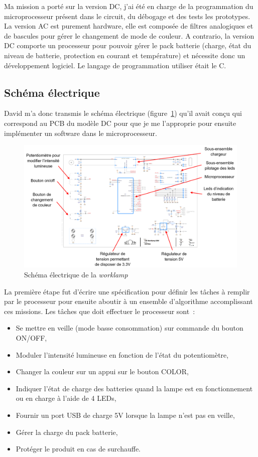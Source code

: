 \documentclass[a4paper, 12pt, sffamily]{report}
\begin{document}
Ma mission a porté sur la version DC, j’ai été en charge de la programmation du microprocesseur présent dans le circuit, du débogage et des tests les prototypes. La version AC est purement hardware, elle est composée de filtres analogiques et de bascules pour gérer le changement de mode de couleur. A contrario, la version DC comporte un processeur pour pouvoir gérer le pack batterie (charge, état du niveau de batterie, protection en courant et température) et nécessite donc un développement logiciel. Le langage de programmation utiliser était le C.

\subsection{Schéma électrique}
David m’a donc transmis le schéma électrique (figure~\ref{fig:worklamp_schema}) qu’il avait conçu qui correspond au PCB du modèle DC pour que je me l’approprie pour ensuite implémenter un software dans le microprocesseur.

\begin{figure}[h]
\centering
\includegraphics[scale=0.51]{figures/screenshots/version_A3_worklamp.png}
\caption{Schéma électrique de la \emph{worklamp}}
\label{fig:worklamp_schema}
\end{figure}

La première étape fut d’écrire une spécification pour définir les tâches à remplir par le processeur pour ensuite aboutir à un ensemble d’algorithme accomplissant ces missions.
Les tâches que doit effectuer le processeur sont~:
\begin{itemize} %
\item Se mettre en veille (mode basse consommation) sur commande du bouton ON/OFF,
\item Moduler l’intensité lumineuse en fonction de l’état du potentiomètre,
\item Changer la couleur sur un appui sur le bouton COLOR,
\item Indiquer l’état de charge des batteries quand la lampe est en fonctionnement ou en charge à l’aide de 4 LEDs,
\item Fournir un port USB de charge 5V lorsque la lampe n’est pas en veille,
\item Gérer la charge du pack batterie,
\item Protéger le produit en cas de surchauffe.
\end{itemize}
\end{document}
